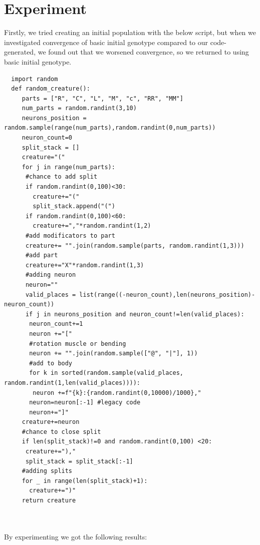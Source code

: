 \documentclass[a4]{article}
\begin{document}
\section{Experiment}
Firstly, we tried creating an initial population with the below script, but when we investigated convergence of basic initial genotype compared to our code-generated, we found out that we worsened convergence, so we returned to using basic initial genotype.
\begin{verbatim}
  import random 
  def random_creature():
	 parts = ["R", "C", "L", "M", "c", "RR", "MM"]
	 num_parts = random.randint(3,10)
	 neurons_position = random.sample(range(num_parts),random.randint(0,num_parts))
	 neuron_count=0
	 split_stack = []
	 creature="("
	 for j in range(num_parts):
	  #chance to add split
	  if random.randint(0,100)<30:
	    creature+="("
	    split_stack.append("(")
 	  if random.randint(0,100)<60:
	    creature+=","*random.randint(1,2)
	  #add modificators to part
	  creature+= "".join(random.sample(parts, random.randint(1,3)))
	  #add part
	  creature+="X"*random.randint(1,3)
	  #adding neuron
	  neuron=""
	  valid_places = list(range((-neuron_count),len(neurons_position)-neuron_count))
	  if j in neurons_position and neuron_count!=len(valid_places):
	   neuron_count+=1
	   neuron +="["
	   #rotation muscle or bending
	   neuron += "".join(random.sample(["@", "|"], 1))
	   #add to body
	   for k in sorted(random.sample(valid_places, random.randint(1,len(valid_places)))):
	    neuron +=f"{k}:{random.randint(0,10000)/1000},"
	   neuron=neuron[:-1] #legacy code
	   neuron+="]"
	 creature+=neuron
	 #chance to close split
	 if len(split_stack)!=0 and random.randint(0,100) <20:
	  creature+="),"
	  split_stack = split_stack[:-1]
	 #adding splits
	 for _ in range(len(split_stack)+1):
	   creature+=")"
	 return creature
	
	
\end{verbatim}
By experimenting we got the following results:
\end{document}
